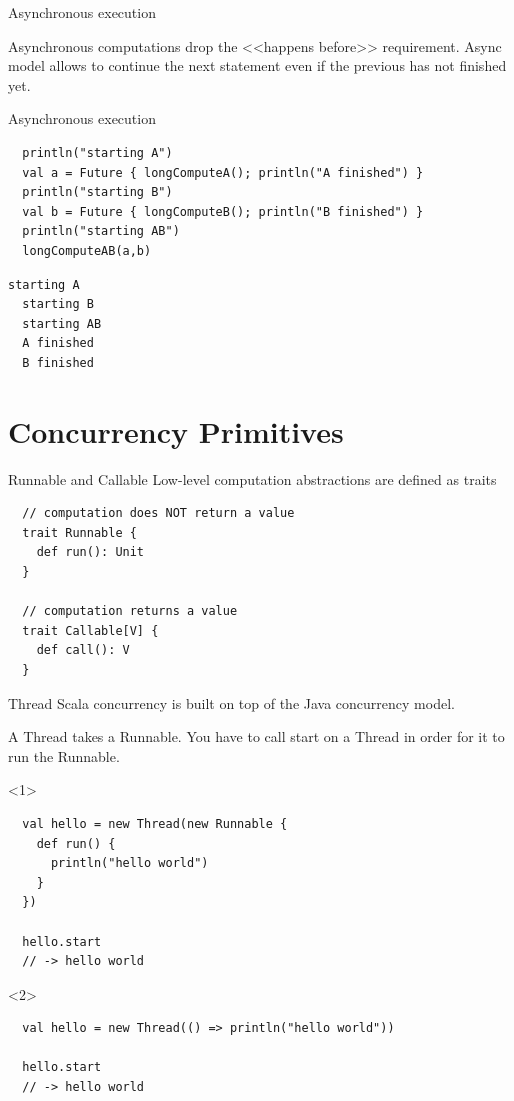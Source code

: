 \documentclass[aspectratio=169]{beamer}
\begin{document}
\begin{frame}{Asynchronous execution}
  \begin{block}{}
    Asynchronous computations drop the <<happens before>> requirement.
    Async model allows to continue the next statement even if the previous has not finished yet.
  \end{block}
\end{frame}

\begin{frame}[fragile]{Asynchronous execution}
  \begin{verbatim}
  println("starting A")
  val a = Future { longComputeA(); println("A finished") }
  println("starting B")
  val b = Future { longComputeB(); println("B finished") }
  println("starting AB")
  longComputeAB(a,b)
  \end{verbatim}
  \bigskip
  \pause
  \begin{Verbatim}[fontsize=\tiny,frame=single]
  starting A
  starting B
  starting AB
  A finished
  B finished
  \end{Verbatim}
\end{frame}

\section{Concurrency Primitives}

\begin{frame}[fragile]{Runnable and Callable}
  Low-level computation abstractions are defined as traits
  \bigskip
  \begin{verbatim}
  // computation does NOT return a value
  trait Runnable {
    def run(): Unit
  }

  // computation returns a value
  trait Callable[V] {
    def call(): V
  }
  \end{verbatim}
\end{frame}

\begin{frame}[fragile,t]{Thread}
  Scala concurrency is built on top of the Java concurrency model.

  A Thread takes a Runnable. You have to call start on a Thread in order for it to run the Runnable.
\bigskip
\begin{onlyenv}<1>
    \begin{verbatim}
  val hello = new Thread(new Runnable {
    def run() {
      println("hello world")
    }
  })
  
  hello.start
  // -> hello world
    \end{verbatim}
\end{onlyenv}
\begin{onlyenv}<2>
    \begin{verbatim}
  val hello = new Thread(() => println("hello world"))

  hello.start
  // -> hello world
    \end{verbatim}
\end{onlyenv}
\end{frame}
\end{document}
